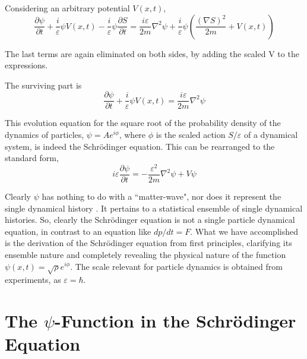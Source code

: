Considering an arbitrary potential $V (x, t)$,
\begin{equation*}
\frac{\partial \psi}{\partial t} + \frac{i}{\varepsilon} \psi V (x,t) - \frac{i}{\varepsilon} \psi \frac{\partial S}{\partial t} = \frac{i\varepsilon}{2m} \nabla^2 \psi + \frac{i}{\varepsilon} \psi \left( \frac{(\nabla S)^2}{2m} + V (x,t)\right)  \tag{20}
\end{equation*}

The last terms are again eliminated on both sides, by adding the scaled V to the expressions.

The surviving part is
\begin{equation*}
\frac{\partial \psi}{\partial t} + \frac{i}{\varepsilon} \psi V (x,t) = \frac{i \varepsilon}{2m} \nabla^2 \psi \tag{21}
\end{equation*}


This evolution equation for the square root of the probability density of the dynamics of
particles, $\psi = Ae^{i\phi}$, where $\phi$ is the scaled action $S/\varepsilon$ of a dynamical system, is indeed the
Schr\"{o}dinger equation. This can be rearranged to the standard form,
\begin{equation*}
i \varepsilon \frac{\partial \psi}{\partial t} = - \frac{\varepsilon^2}{2m} \nabla^2 \psi + V \psi \tag{22}
\end{equation*}

Clearly $\psi$ has nothing to do with a ``matter-wave", nor does it represent the single dynamical
history \cite{chap27-key2}. It pertains to a statistical ensemble of single dynamical histories. So, clearly the
Schr\"{o}dinger equation is not a single particle dynamical equation, in contrast to an equation
like $dp/dt = F$. What we have accomplished is the derivation of the Schr\"{o}dinger equation
from first principles, clarifying its ensemble nature and completely revealing the physical
nature of the function $\psi (x, t) = \sqrt{\rho}e^{i\phi}$. The scale relevant for particle dynamics is obtained
from experiments, as $\varepsilon = \hbar$.

\section{The $\psi$-Function in the Schr\"{o}dinger Equation}%

